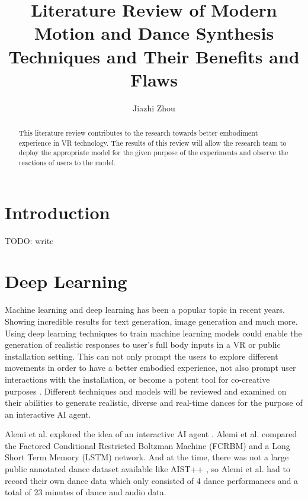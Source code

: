 \documentclass[final,5p,times,twocolumn,authoryear]{article}
\begin{document}
\title{Literature Review of Modern Motion and Dance Synthesis Techniques and Their Benefits and Flaws}
\author{Jiazhi Zhou}
\maketitle

\begin{abstract}

This literature review contributes to the research towards better embodiment experience in VR technology. The results of this review will allow the research team to deploy the appropriate model for the given purpose of the experiments and observe the reactions of users to the model.

\end{abstract}

\section{Introduction}

TODO: write

\section{Deep Learning}

Machine learning and deep learning has been a popular topic in recent
years. Showing incredible results for text generation, image generation
and much more.  Using deep learning techniques to train machine learning
models could enable the generation of realistic responses to user's full
body inputs in a VR or public installation setting.  This can not only
prompt the users to explore different movements in order to have a
better embodied experience, not also prompt user interactions with the
installation, or become a potent tool for co-creative purposes
\cite{Wallace2023}.  Different techniques and models will be reviewed
and examined on their abilities to generate realistic, diverse and
real-time dances for the purpose of an interactive AI agent.

Alemi et al. explored the idea of an interactive AI agent
\cite{Alemi2017}. Alemi et al. compared the Factored Conditional
Restricted Boltzman Machine (FCRBM) and a Long Short Term Memory (LSTM)
network. And at the time, there was not a large public annotated dance
dataset available like AIST++ \cite{Li2021}, so Alemi et al. had to
record their own dance data which only consisted of 4 dance performances
and a total of 23 minutes of dance and audio data.
\end{document}
